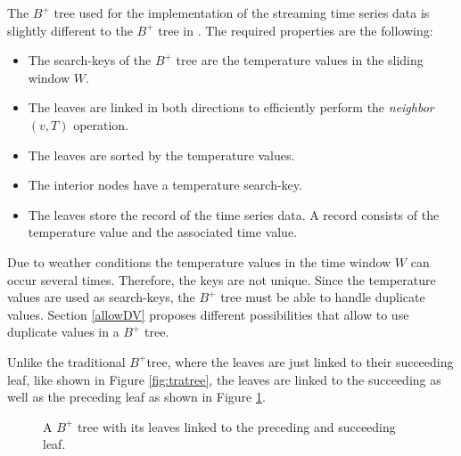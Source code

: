 \documentclass[abstracton,12pt]{scrreprt}
\begin{document}
The $B^+$ tree used for the implementation of the streaming time series data is slightly different to the  $B^+$ tree in \cite{BTreeBook}. The required properties are the following: \\
\begin{itemize}  
	\item The search-keys of the $B^+$ tree are the temperature values in the sliding window $W$.
	\item The leaves are linked in both directions to efficiently perform the \emph{neighbor}$(v,T)$ operation.
	\item The leaves are sorted by the temperature values.
	\item The interior nodes have a temperature search-key.
	\item The leaves store the record of the time series data. A record consists of the temperature value and the associated time value.\\ 
\end{itemize}
Due to weather conditions the temperature values in the time window $W$ can occur several times. Therefore, the keys are not unique. Since the temperature values are used as search-keys, the $B^+$ tree must be able to handle duplicate values. Section \ref{allowDV} proposes different possibilities that allow to use duplicate values in a $B^+$ tree. 


Unlike the traditional $B^+$tree, where the leaves are just linked to their succeeding leaf, like shown in Figure \ref{fig:tratree}, the leaves are linked to the succeeding as well as the preceding leaf as shown in Figure \ref{fig:sptree}.\\

\begin{figure}[H]
	\centering
	\caption{A $B^+$ tree with its leaves linked to the preceding and succeeding leaf.}
	\label{fig:sptree}
\end{figure}
\end{document}
